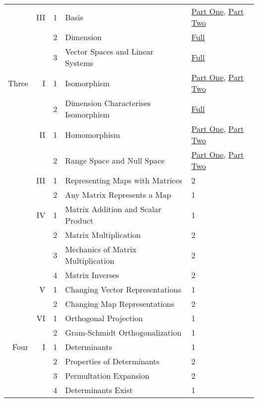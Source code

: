 \documentclass{article}
\begin{document}
\begin{center}
\begin{tabular}{|rrc|ll|}
      \cline{4-5}
      &III &1 &Basis                              &\href{https://youtu.be/4vlyOrrESN0}{Part One}, \href{https://youtu.be/0zXzOfCQeds}{Part Two}   \\
      &    &2 &Dimension                          &\href{https://youtu.be/vnYjwQ8VV3Y}{Full}   \\
      &    &3 &Vector Spaces and Linear Systems   &\href{https://youtu.be/pPFSLeJJrd8}{Full}    \\
 \hline
 Three&I   &1 &Isomorphism                        &\href{https://youtu.be/jztZkKNiujg}{Part One}, \href{https://youtu.be/iNXBRlpR4mQ}{Part Two}   \\
      &    &2 &Dimension Characterises Isomorphism&\href{https://youtu.be/dh3C6dt53Jk}{Full}   \\
      \cline{4-5}
      &II  &1 &Homomorphism                       &\href{https://youtu.be/tS2AJqwyvFo}{Part One}, \href{https://youtu.be/gm1KIYKKbpQ}{Part Two}   \\
      &    &2 &Range Space and Null Space         &\href{https://youtu.be/1wKqFvgXHpw}{Part One}, \href{}{Part Two}   \\
      \cline{4-5}
      &III &1 &Representing Maps with Matrices    &2   \\
      &    &2 &Any Matrix Represents a Map        &1   \\
      \cline{4-5}
      &IV  &1 &Matrix Addition and Scalar Product &1   \\
      &    &2 &Matrix Multiplication              &2   \\
      &    &3 &Mechanics of Matrix Multiplication &2   \\
      &    &4 &Matrix Inverses                    &2   \\
      \cline{4-5}
      &V   &1 &Changing Vector Representations    &1   \\
      &    &2 &Changing Map Representations       &2   \\
      \cline{4-5}
      &VI  &1 &Orthogonal Projection              &1   \\
      &    &2 &Gram-Schmidt Orthogonalization     &1   \\
  \hline
 Four &I   &1 &Determinants                       &1   \\
      &    &2 &Properties of Determinants         &2   \\
      &    &3 &Permultation Expansion             &2   \\
      &    &4 &Determinants Exist                 &1   \\

\end{tabular}
\end{center}
\end{document}
